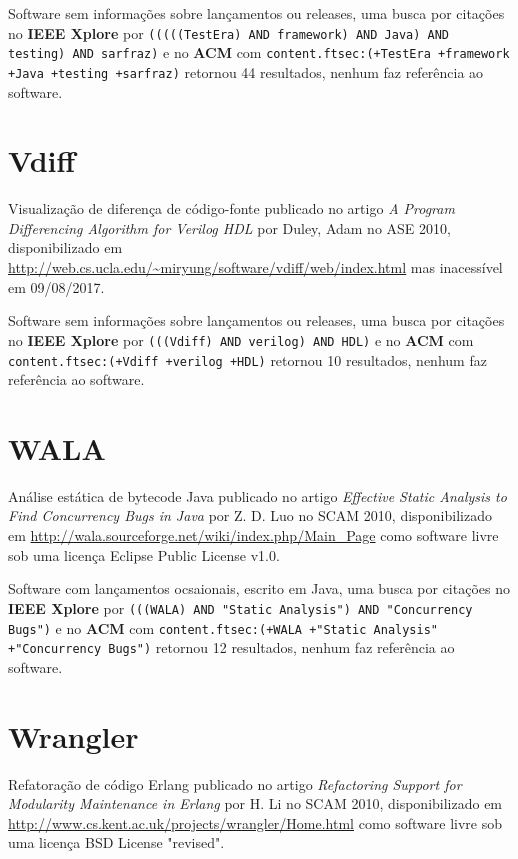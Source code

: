 Software sem informações sobre lançamentos ou releases,
uma busca por citações no {\bf IEEE Xplore} por
\texttt{(((((TestEra) AND framework) AND Java) AND testing) AND sarfraz)}
e no {\bf ACM} com
\texttt{content.ftsec:(+TestEra +framework +Java +testing +sarfraz)}
retornou
44 resultados,
nenhum faz referência ao software.



\section{Vdiff}

Visualização de diferença de código-fonte
publicado no artigo {\it A Program Differencing Algorithm for Verilog HDL}
por Duley, Adam
no ASE 2010,
disponibilizado em \url{http://web.cs.ucla.edu/~miryung/software/vdiff/web/index.html}
mas inacessível em 09/08/2017.

Software sem informações sobre lançamentos ou releases,
uma busca por citações no {\bf IEEE Xplore} por
\texttt{(((Vdiff) AND verilog) AND HDL)}
e no {\bf ACM} com
\texttt{content.ftsec:(+Vdiff +verilog +HDL)}
retornou
10 resultados,
nenhum faz referência ao software.



\section{WALA}

Análise estática de bytecode Java
publicado no artigo {\it Effective Static Analysis to Find Concurrency Bugs in Java}
por Z. D. Luo
no SCAM 2010,
disponibilizado em \url{http://wala.sourceforge.net/wiki/index.php/Main_Page}
como software livre
sob uma licença Eclipse Public License v1.0.

Software com lançamentos ocsaionais,
escrito em Java,
uma busca por citações no {\bf IEEE Xplore} por
\texttt{(((WALA) AND "Static Analysis") AND "Concurrency Bugs")}
e no {\bf ACM} com
\texttt{content.ftsec:(+WALA +"Static Analysis" +"Concurrency Bugs")}
retornou
12 resultados,
nenhum faz referência ao software.



\section{Wrangler}

Refatoração de código Erlang
publicado no artigo {\it Refactoring Support for Modularity Maintenance in Erlang}
por H. Li
no SCAM 2010,
disponibilizado em \url{http://www.cs.kent.ac.uk/projects/wrangler/Home.html}
como software livre
sob uma licença BSD License "revised".

